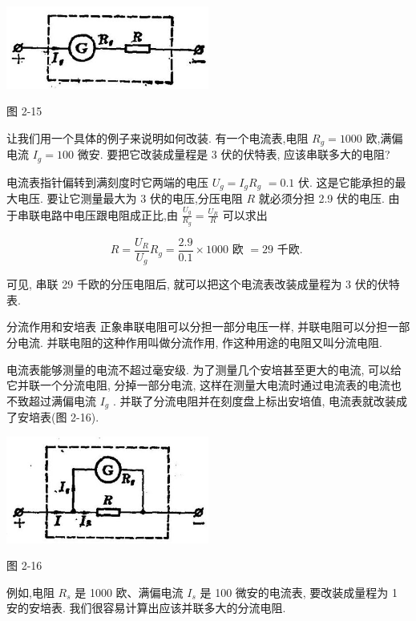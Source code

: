 \documentclass[10pt]{article}
\begin{document}
\begin{center}
\includegraphics[max width=0.5\textwidth]{images/01913056-1f15-74d8-9184-9aab52c9d66b_82_643912.jpg}
\end{center}

图 2-15

让我们用一个具体的例子来说明如何改装. 有一个电流表,电阻 \({R}_{g} = {1000}\) 欧,满偏电流 \({I}_{g} = {100}\) 微安. 要把它改装成量程是 3 伏的伏特表, 应该串联多大的电阻?

电流表指针偏转到满刻度时它两端的电压 \({U}_{g} = {I}_{g}{R}_{g}\) \(= {0.1}\) 伏. 这是它能承担的最大电压. 要让它测量最大为 3 伏的电压,分压电阻 \(R\) 就必须分担 2.9 伏的电压. 由于串联电路中电压跟电阻成正比,由 \(\frac{{U}_{g}}{{R}_{g}} = \frac{{U}_{R}}{R}\) 可以求出

\[
R = \frac{{U}_{R}}{{U}_{g}}{R}_{g} = \frac{2.9}{0.1} \times {1000}\text{ 欧 } = {29}\text{ 千欧. }
\]

可见, 串联 29 千欧的分压电阻后, 就可以把这个电流表改装成量程为 3 伏的伏特表.

分流作用和安培表 正象串联电阻可以分担一部分电压一样, 并联电阻可以分担一部分电流. 并联电阻的这种作用叫做分流作用, 作这种用途的电阻又叫分流电阻.

电流表能够测量的电流不超过毫安级. 为了测量几个安培甚至更大的电流, 可以给它并联一个分流电阻, 分掉一部分电流, 这样在测量大电流时通过电流表的电流也不致超过满偏电流 \({I}_{g}\) . 并联了分流电阻并在刻度盘上标出安培值, 电流表就改装成了安培表(图 2-16).

\begin{center}
\includegraphics[max width=0.5\textwidth]{images/01913056-1f15-74d8-9184-9aab52c9d66b_83_802621.jpg}
\end{center}

图 2-16

例如,电阻 \({R}_{s}\) 是 1000 欧、满偏电流 \({I}_{s}\) 是 100 微安的电流表, 要改装成量程为 1 安的安培表. 我们很容易计算出应该并联多大的分流电阻.
\end{document}
